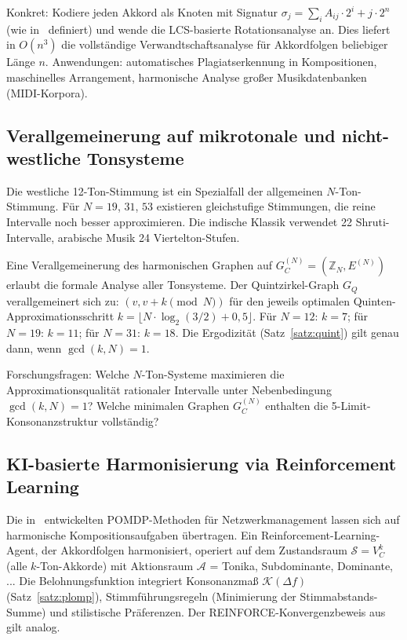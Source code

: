 ﻿\documentclass[a4paper,12pt]{article}
\theoremstyle{definition}
\begin{document}
Konkret: Kodiere jeden Akkord als Knoten mit Signatur $\sigma_j = \sum_{i} A_{ij}
\cdot 2^i + j \cdot 2^n$ (wie in~\cite{epp2026subgraph} definiert) und wende die
LCS-basierte Rotationsanalyse an. Dies liefert in $O(n^3)$ die vollständige
Verwandtschaftsanalyse für Akkordfolgen beliebiger Länge $n$. Anwendungen: automatisches
Plagiatserkennung in Kompositionen, maschinelles Arrangement, harmonische Analyse
großer Musikdatenbanken (MIDI-Korpora).

\subsection{Verallgemeinerung auf mikrotonale und nicht-westliche Tonsysteme}

Die westliche 12-Ton-Stimmung ist ein Spezialfall der allgemeinen $N$-Ton-Stimmung.
Für $N = 19$, $31$, $53$ existieren gleichstufige Stimmungen, die reine Intervalle
noch besser approximieren. Die indische Klassik verwendet 22 Shruti-Intervalle,
arabische Musik 24 Viertelton-Stufen.

Eine Verallgemeinerung des harmonischen Graphen auf $G_C^{(N)} = (\mathbb{Z}_N, E^{(N)})$
erlaubt die formale Analyse aller Tonsysteme. Der Quintzirkel-Graph $G_Q$ verallgemeinert
sich zu: $(v, v + k \pmod{N})$ für den jeweils optimalen Quinten-Approximationsschritt
$k = \lfloor N \cdot \log_2(3/2) + 0{,}5 \rfloor$. Für $N=12$: $k=7$; für $N=19$: $k=11$;
für $N=31$: $k=18$. Die Ergodizität (Satz~\ref{satz:quint}) gilt genau dann, wenn
$\gcd(k, N) = 1$.

Forschungsfragen: Welche $N$-Ton-Systeme maximieren die Approximationsqualität
rationaler Intervalle unter Nebenbedingung $\gcd(k,N)=1$? Welche minimalen Graphen
$G_C^{(N)}$ enthalten die 5-Limit-Konsonanzstruktur vollständig?

\subsection{KI-basierte Harmonisierung via Reinforcement Learning}

Die in~\cite{epp2026hetnet} entwickelten POMDP-Methoden für Netzwerkmanagement
lassen sich auf harmonische Kompositionsaufgaben übertragen. Ein
Reinforcement-Learning-Agent, der Akkordfolgen harmonisiert, operiert auf dem
Zustandsraum $\mathcal{S} = V_C^k$ (alle $k$-Ton-Akkorde) mit Aktionsraum
$\mathcal{A}$ = {Tonika, Subdominante, Dominante, ..}. Die Belohnungsfunktion
integriert Konsonanzmaß $\mathcal{K}(\Delta f)$ (Satz~\ref{satz:plomp}),
Stimmführungsregeln (Minimierung der Stimmabstands-Summe) und stilistische
Präferenzen. Der REINFORCE-Konvergenzbeweis aus~\cite{epp2026hetnet} gilt analog.
\end{document}
